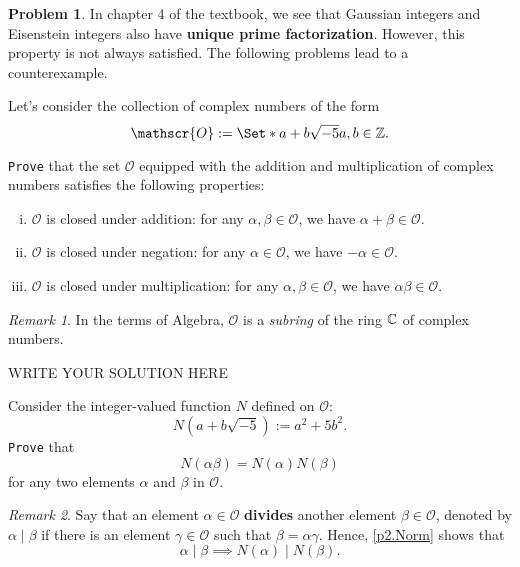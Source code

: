 \documentclass[11pt]{article}
\theoremstyle{plain}
\theoremstyle{definition}
\newtheorem{problem}{Problem}
\theoremstyle{remark}
\newtheorem*{remark}{Remark}
\numberwithin{equation}{problem}
\providecommand\given{}
\begin{document}
\begin{problem}
	In chapter 4 of the textbook, we see that Gaussian integers and Eisenstein integers also have \textbf{unique prime factorization}. 
	However, this property is not always satisfied.
	The following problems lead to a counterexample. 

	Let's consider the collection of complex numbers of the form
	\[
		\mathscr{O} := \Set*{	a+b\sqrt{-5}	\given	a,b\in\Z	}.
	\]
	\begin{listinprob}
		\item \texttt{Prove} that the set $\mathscr{O}$ equipped with the addition and multiplication of complex numbers satisfies the following properties:
		\begin{enumerate}[(i)]
			\item $\mathscr{O}$ is closed under addition: for any $\alpha,\beta\in\mathscr{O}$, we have $\alpha+\beta\in\mathscr{O}$.
			\item $\mathscr{O}$ is closed under negation: for any $\alpha\in\mathscr{O}$, we have $-\alpha\in\mathscr{O}$.
			\item $\mathscr{O}$ is closed under multiplication: for any $\alpha,\beta\in\mathscr{O}$, we have $\alpha\beta\in\mathscr{O}$.
		\end{enumerate}
		\begin{remark}
			In the terms of Algebra, $\mathscr{O}$ is a \emph{subring} of the ring $\mathbb{C}$ of complex numbers.
		\end{remark}
\begin{solution} %
WRITE YOUR SOLUTION HERE
\end{solution}\clearpage %
		\item\label{p2.Norm} Consider the integer-valued function $N$ defined on $\mathscr{O}$: 
		\[
			N(a+b\sqrt{-5}) := a^2+5b^2.
		\]
		\texttt{Prove} that 
		\[
			N(\alpha\beta) = N(\alpha)N(\beta)
		\]
		for any two elements $\alpha$ and $\beta$ in $\mathscr{O}$.
		\begin{remark}
			Say that an element $\alpha\in\mathscr{O}$ \textbf{divides} another element $\beta\in\mathscr{O}$, denoted by $\alpha\mid\beta$ if there is an element $\gamma\in\mathscr{O}$ such that $\beta=\alpha\gamma$. Hence, \cref{p2.Norm} shows that 
			\[
				\alpha \mid \beta \implies N(\alpha) \mid N(\beta).
			\]
		\end{remark}
\begin{solution} %

\end{solution}
\end{listinprob}
\end{problem}
\end{document}
